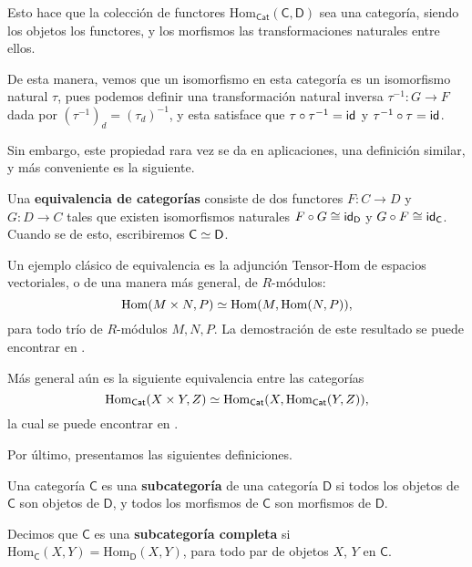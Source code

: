 \documentclass[../main.tex]{subfiles}
\begin{document}
Esto hace que la colecci\'on de functores $\text{Hom}_{\mathsf{Cat}}(\mathsf{C}, \mathsf{D})$ sea una categor\'ia, siendo los objetos los functores, y los morfismos las transformaciones naturales entre ellos.

De esta manera, vemos que un isomorfismo en esta categor\'ia es un isomorfismo natural $\tau$, pues podemos definir una transformaci\'on natural inversa $\tau^{-1}:G \to F$ dada por $(\tau^{-1})_d=(\tau_d)^{-1}$, y esta satisface que $\tau \circ \tau^{-1}=\idfunc$ y $\tau^{-1}\circ \tau=\idfunc$.

Sin embargo, este propiedad rara vez se da en aplicaciones, una definici\'on similar, y m\'as conveniente es la siguiente.

\begin{definitionap}
    Una \textbf{equivalencia de categor\'ias} consiste de dos functores $F:C \to D$ y $G:D \to C$ tales que existen isomorfismos naturales $F \circ G \cong \idfunc[\mathsf{D}]$ y $G \circ F \cong \idfunc[\mathsf{C}]$. Cuando se de esto, escribiremos $\eqv{\mathsf{C}}{\mathsf{D}}$.
\end{definitionap}

\begin{exampleap}\label{tensor-hom}
    Un ejemplo cl\'asico de equivalencia es la adjunci\'on Tensor-Hom de espacios vectoriales, o de una manera m\'as general, de $R$-m\'odulos:
    \[ \eqv{\text{Hom}(M \times N, P)}{\text{Hom}(M, \text{Hom}(N,P))}, \]
    para todo tr\'io de $R$-m\'odulos $M,N,P$. La demostración de este resultado se puede encontrar en \cite{aluffi_algebra_2009}.

    M\'as general a\'un es la siguiente equivalencia entre las categor\'ias
    \[ \eqv{\text{Hom}_{\mathsf{Cat}}(X \times Y, Z)}{\text{Hom}_{\mathsf{Cat}}(X, \text{Hom}_{\mathsf{Cat}}(Y,Z))}, \]
    la cual se puede encontrar en \cite{mac_lane_categories_2010}.
\end{exampleap}

Por \'ultimo, presentamos las siguientes definiciones.

\begin{definitionap}
    Una categor\'ia $\mathsf{C}$ es una \textbf{subcategor\'ia} de una categor\'ia $\mathsf{D}$ si todos los objetos de $\mathsf{C}$ son objetos de $\mathsf{D}$, y todos los morfismos de $\mathsf{C}$ son morfismos de $\mathsf{D}$.

    Decimos que $\mathsf{C}$ es una \textbf{subcategor\'ia completa} si $\text{Hom}_\mathsf{C}(X,Y)=\text{Hom}_\mathsf{D}(X,Y)$, para todo par de objetos $X$, $Y$ en $\mathsf{C}$.
\end{definitionap}
\end{document}
